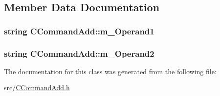 \subsection{Member Data Documentation}
\subsubsection[{\texorpdfstring{m\+\_\+\+Operand1}{m_Operand1}}]{\setlength{\rightskip}{0pt plus 5cm}string C\+Command\+Add\+::m\+\_\+\+Operand1\hspace{0.3cm}{\ttfamily [private]}}\hypertarget{classCCommandAdd_abcd42da999946000498850d594d2720b}{}\label{classCCommandAdd_abcd42da999946000498850d594d2720b}
\subsubsection[{\texorpdfstring{m\+\_\+\+Operand2}{m_Operand2}}]{\setlength{\rightskip}{0pt plus 5cm}string C\+Command\+Add\+::m\+\_\+\+Operand2\hspace{0.3cm}{\ttfamily [private]}}\hypertarget{classCCommandAdd_aa27354561d8bfe6e81409fbe35dfede8}{}\label{classCCommandAdd_aa27354561d8bfe6e81409fbe35dfede8}


The documentation for this class was generated from the following file\+:\begin{DoxyCompactItemize}
\item 
src/\hyperlink{CCommandAdd_8h}{C\+Command\+Add.\+h}\end{DoxyCompactItemize}
